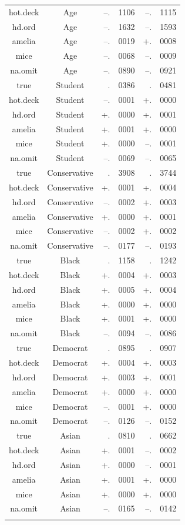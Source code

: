 \documentclass[12pt,econ]{sources/authesis}
\begin{document}
\begin{longtable}{ccr@{}lr@{}l}
 hot.deck & Age & --.&1106 & --.&1115 \\ 
 hd.ord & Age & --.&1632 & --.&1593 \\
 amelia & Age & --.&0019 & +.&0008 \\ 
 mice & Age & --.&0068 & --.&0009 \\ 
 na.omit & Age & --.&0890 & --.&0921 \\ 
 true & Student & .&0386 & .&0481 \\ 
 hot.deck & Student & --.&0001 & +.&0000 \\
 hd.ord & Student & +.&0000 & +.&0001 \\
 amelia & Student & +.&0001 & +.&0000 \\
 mice & Student & +.&0000 & --.&0001 \\
 na.omit & Student & --.&0069 & --.&0065 \\ 
 true & Conservative & .&3908 & .&3744 \\ 
 hot.deck & Conservative & +.&0001 & +.&0004 \\
 hd.ord & Conservative & --.&0002 & +.&0003 \\ 
 amelia & Conservative & +.&0000 & +.&0001 \\ 
 mice & Conservative & --.&0002 & +.&0002 \\
 na.omit & Conservative & --.&0177 & --.&0193 \\
 true & Black & .&1158 & .&1242 \\ 
 hot.deck & Black & +.&0004 & +.&0003 \\ 
 hd.ord & Black & +.&0005 & +.&0004 \\ 
 amelia & Black & +.&0000 & +.&0000 \\ 
 mice & Black & +.&0001 & +.&0000 \\
 na.omit & Black & --.&0094 & --.&0086 \\
 true & Democrat & .&0895 & .&0907 \\ 
 hot.deck & Democrat & +.&0004 & +.&0003 \\ 
 hd.ord & Democrat & +.&0003 & +.&0001 \\ 
 amelia & Democrat & +.&0000 & +.&0000 \\
 mice & Democrat & --.&0001 & +.&0000 \\
 na.omit & Democrat & --.&0126 & --.&0152 \\ 
 true & Asian & .&0810 & .&0662 \\
 hot.deck & Asian & +.&0001 & --.&0002 \\ 
 hd.ord & Asian & +.&0000 & --.&0001 \\
 amelia & Asian & +.&0001 & +.&0000 \\
 mice & Asian & +.&0000 & +.&0000 \\ 
 na.omit & Asian & --.&0165 & --.&0142 \\ 
 \hline \\[-1.8ex]
 \end{longtable}
\dsp
\end{document}
